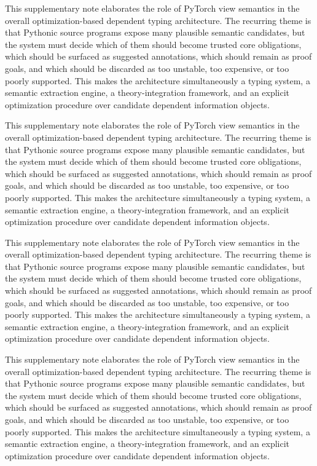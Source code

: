 \documentclass[11pt]{article}
\theoremstyle{definition}
\theoremstyle{plain}
\begin{document}
This supplementary note elaborates the role of PyTorch view semantics in the overall
optimization-based dependent typing architecture. The recurring theme is that
Pythonic source programs expose many plausible semantic candidates, but the
system must decide which of them should become trusted core obligations, which
should be surfaced as suggested annotations, which should remain as proof
goals, and which should be discarded as too unstable, too expensive, or too
poorly supported. This makes the architecture simultaneously a typing system,
a semantic extraction engine, a theory-integration framework, and an explicit
optimization procedure over candidate dependent information objects.

This supplementary note elaborates the role of PyTorch view semantics in the overall
optimization-based dependent typing architecture. The recurring theme is that
Pythonic source programs expose many plausible semantic candidates, but the
system must decide which of them should become trusted core obligations, which
should be surfaced as suggested annotations, which should remain as proof
goals, and which should be discarded as too unstable, too expensive, or too
poorly supported. This makes the architecture simultaneously a typing system,
a semantic extraction engine, a theory-integration framework, and an explicit
optimization procedure over candidate dependent information objects.

This supplementary note elaborates the role of PyTorch view semantics in the overall
optimization-based dependent typing architecture. The recurring theme is that
Pythonic source programs expose many plausible semantic candidates, but the
system must decide which of them should become trusted core obligations, which
should be surfaced as suggested annotations, which should remain as proof
goals, and which should be discarded as too unstable, too expensive, or too
poorly supported. This makes the architecture simultaneously a typing system,
a semantic extraction engine, a theory-integration framework, and an explicit
optimization procedure over candidate dependent information objects.

This supplementary note elaborates the role of PyTorch view semantics in the overall
optimization-based dependent typing architecture. The recurring theme is that
Pythonic source programs expose many plausible semantic candidates, but the
system must decide which of them should become trusted core obligations, which
should be surfaced as suggested annotations, which should remain as proof
goals, and which should be discarded as too unstable, too expensive, or too
poorly supported. This makes the architecture simultaneously a typing system,
a semantic extraction engine, a theory-integration framework, and an explicit
optimization procedure over candidate dependent information objects.
\end{document}
